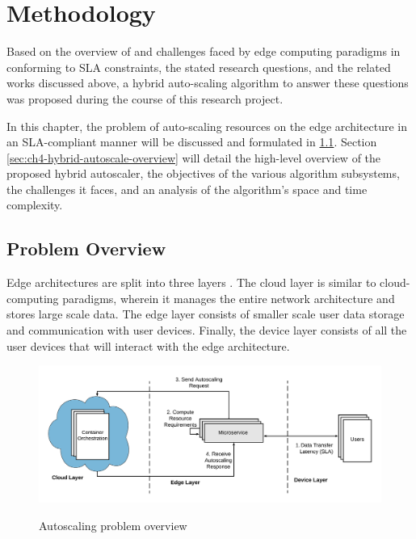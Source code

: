 \clearpage

\def\chaptertitle{Methodology}

\lhead{\emph{\chaptertitle}}

\chapter{\chaptertitle}
\label{ch:methodology}

Based on the overview of and challenges faced by edge computing paradigms in conforming to SLA constraints, the stated research questions, and the related works discussed above, a hybrid auto-scaling algorithm to answer these questions was proposed during the course of this research project.\par

In this chapter, the problem of auto-scaling resources on the edge architecture in an SLA-compliant manner will be discussed and formulated in \ref{sec:ch4-problem-overview}. Section \ref{sec:ch4-hybrid-autoscale-overview} will detail the high-level overview of the proposed hybrid autoscaler, the objectives of the various algorithm subsystems, the challenges it faces, and an analysis of the algorithm's space and time complexity.

\section{Problem Overview}
\label{sec:ch4-problem-overview}

Edge architectures are split into three layers \cite{hamdan2020edge}. 
The cloud layer is similar to cloud-computing paradigms, wherein it manages the entire network architecture and stores large scale data. The edge layer consists of smaller scale user data storage and communication with user devices. Finally, the device layer consists of all the user devices that will interact with the edge architecture.\par

\begin{figure}[htb]
    \centering
    \caption{Autoscaling problem overview}
    \includegraphics[width=1.0\linewidth]{Figures/Problem-Overview.pdf}
    \label{fig:autoscaling-problem-overview}
\end{figure}

